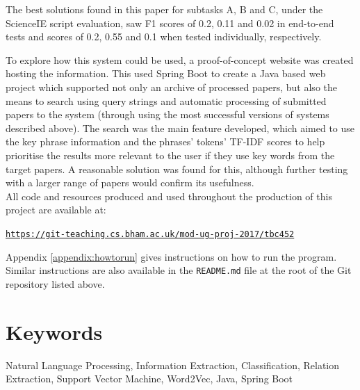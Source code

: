 \documentclass[a4paper]{report}
\begin{document}
The best solutions found in this paper for subtasks A, B and C, under the ScienceIE script evaluation, saw F1 scores of 0.2, 0.11 and 0.02 in end-to-end tests and scores of 0.2, 0.55 and 0.1 when tested individually, respectively. 

To explore how this system could be used, a proof-of-concept website was created hosting the information. This used Spring Boot to create a Java based web project which supported not only an archive of processed papers, but also the means to search using query strings and automatic processing of submitted papers to the system (through using the most successful versions of systems described above). The search was the main feature developed, which aimed to use the key phrase information and the phrases' tokens' TF-IDF scores to help prioritise the results more relevant to the user if they use key words from the target papers. A reasonable solution was found for this, although further testing with a larger range of papers would confirm its usefulness. \\

\noindent All code and resources produced and used throughout the production of this project are available at:
\begin{center}
	\texttt{\href{https://git-teaching.cs.bham.ac.uk/mod-ug-proj-2017/tbc452}{https://git-teaching.cs.bham.ac.uk/mod-ug-proj-2017/tbc452}}
\end{center}
\noindent Appendix \ref{appendix:howtorun} gives instructions on how to run the program. Similar instructions are also available in the \texttt{README.md} file at the root of the Git repository listed above.

\section*{Keywords}
Natural Language Processing, Information Extraction, Classification, Relation Extraction, Support Vector Machine, Word2Vec, Java, Spring Boot

\pagebreak

\tableofcontents
\listoffigures
\listoftables
\pagebreak




\pagebreak

\pagebreak

\pagebreak

\pagebreak

\pagebreak

\pagebreak

\pagebreak


\pagebreak



\pagebreak

\end{document}
